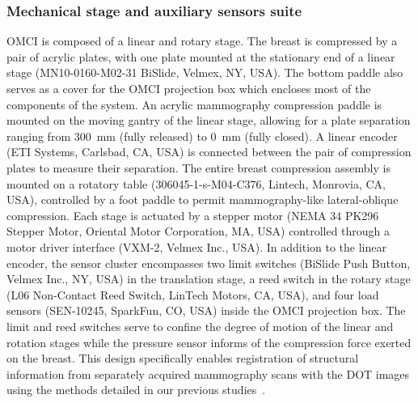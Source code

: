 \subsubsection{Mechanical stage and auxiliary sensors suite}
OMCI is composed of a linear and rotary stage. The breast is compressed by a pair of acrylic plates, with one plate mounted at the stationary end of a linear stage (MN10-0160-M02-31 BiSlide, Velmex, NY, USA). The bottom paddle also serves as a cover for the OMCI projection box which encloses most of the components of the system. An acrylic mammography compression paddle is mounted on the moving gantry of the linear stage, allowing for a plate separation ranging from 300~mm (fully released) to 0~mm (fully closed). A linear encoder (ETI Systems, Carlsbad, CA, USA) is connected between the pair of compression plates to measure their separation. The entire breast compression assembly is mounted on a rotatory table (306045-1-s-M04-C376, Lintech, Monrovia, CA, USA), controlled by a foot paddle to permit mammography-like lateral-oblique compression. Each stage is actuated by a stepper motor (NEMA 34 PK296 Stepper Motor, Oriental Motor Corporation, MA, USA) controlled through a motor driver interface (VXM-2, Velmex Inc., USA). In addition to the linear encoder, the sensor cluster encompasses two limit switches (BiSlide Push Button, Velmex Inc., NY, USA) in the translation stage, a reed switch in the rotary stage (L06 Non-Contact Reed Switch, LinTech Motors, CA, USA), and four load sensors (SEN-10245, SparkFun, CO, USA) inside the OMCI projection box. The limit and reed switches serve to confine the degree of motion of the linear and rotation stages while the pressure sensor informs of the compression force exerted on the breast. This design specifically enables registration of structural information from separately acquired mammography scans with the DOT images using the methods detailed in our previous studies~\cite{Deng2015}.

